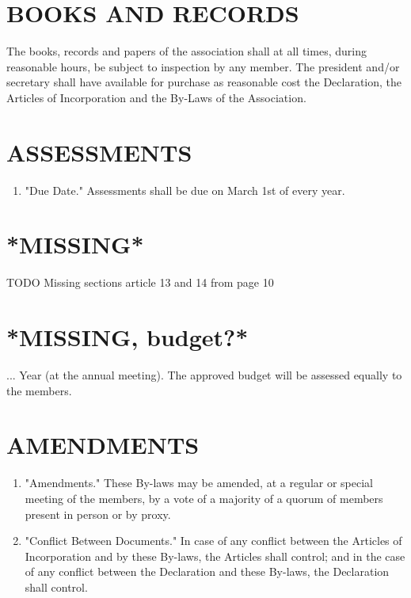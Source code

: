 \documentclass[12pt, letterpaper]{article}
\begin{document}
\section{BOOKS AND RECORDS}
The books, records and papers of the association shall at all times, during reasonable hours, be subject to inspection by any member.
The president and/or secretary shall have available for purchase as reasonable cost the Declaration, the Articles of Incorporation and the By-Laws of the Association.

\section{ASSESSMENTS}
\begin{enumerate}
 \item "Due Date."
  Assessments shall be due on March 1st of every year.

\end{enumerate}

\section{*MISSING*}
TODO Missing sections article 13 and 14 from page 10

\section{*MISSING, budget?*}
... Year (at the annual meeting).
The approved budget will be assessed equally to the members.

\section{AMENDMENTS}
\begin{enumerate}
 \item "Amendments."
  These By-laws may be amended, at a regular or special meeting of the members, by a vote of a majority of a quorum of members present in person or by proxy.
 \item "Conflict Between Documents."
  In case of any conflict between the Articles of Incorporation and by these By-laws, the Articles shall control; and in the case of any conflict between the Declaration and these By-laws, the Declaration shall control.
\end{enumerate}
\end{document}
